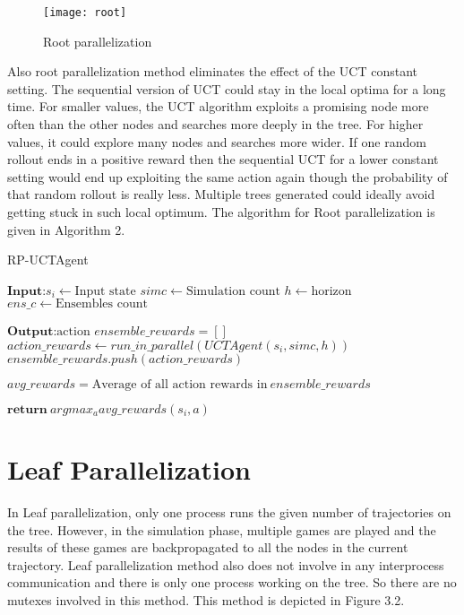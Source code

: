 \documentclass[double,12pt]{beavtex}
\begin{document}
\begin{figure}[h!]
\centering
\texttt{[image: root]}
\caption{Root parallelization}
\end{figure}

Also root parallelization method eliminates the effect of the UCT constant setting. The sequential version of UCT could stay in the local optima for a long time. For smaller values, the UCT algorithm exploits a promising node more often than the other nodes and searches more deeply in the tree. For higher values, it could explore many nodes and searches more wider. If one random rollout ends in a positive reward then the sequential UCT for a lower constant setting would end up exploiting the same action again though the probability of that random rollout is really less. Multiple trees generated could ideally avoid getting stuck in such local optimum. The algorithm for Root parallelization is given in Algorithm 2. 

\begin{algorithm}
	\caption{RP-UCTAgent}
	\label{alg:smartmeter}
	\begin{algorithmic}[1]
		\Statex $\textbf{Input:}   s_i \leftarrow \text{Input state}$
		\Statex $simc\leftarrow \text{Simulation count}$ 
		\Statex $h\leftarrow \text{horizon}$
		\Statex $ens\_c\leftarrow \text{Ensembles count}$

		\Statex $\textbf{Output:}  \text{action}$
		\State $ensemble\_rewards = []$
			\State $action\_rewards \leftarrow run\_in\_parallel(UCTAgent(s_i, simc, h))$
			\State $ensemble\_rewards.push(action\_rewards)$
		\EndFor

		\State $avg\_rewards = \text{Average of all action rewards in}~ensemble\_rewards$

		\Statex $\textbf{return}~argmax_aavg\_rewards(s_i,a)$
	\end{algorithmic}
\end{algorithm}

\section{Leaf Parallelization}
In Leaf parallelization, only one process runs the given number of trajectories on the tree. However, in the simulation phase, multiple games are played and the results of these games are backpropagated to all the nodes in the current trajectory. Leaf parallelization method also does not involve in any interprocess communication and there is only one process working on the tree. So there are no mutexes involved in this method. This method is depicted in Figure 3.2. 
\end{document}
